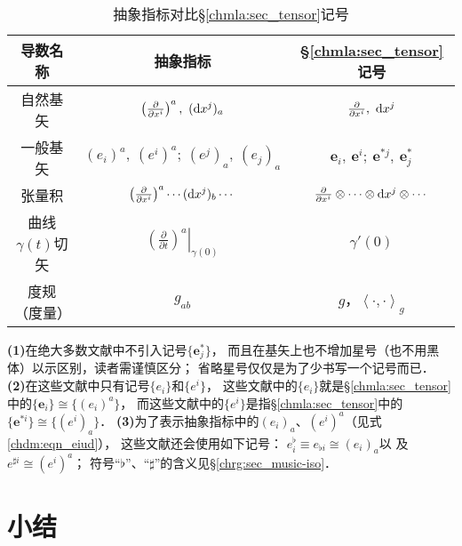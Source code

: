 \begin{table}[htb]
    \centering
    \caption{抽象指标对比\S\ref{chmla:sec_tensor}记号} \label{chmla:tab-aivscc}
    \begin{tabular}{|*3{c|}}
        \hline
        导数名称 & 抽象指标 & \S\ref{chmla:sec_tensor}记号 \\ 
        \hline
        自然基矢 & $\left(\frac{\partial}{\partial x^i} \right)^a,\  ({\rm d}x^j)_a$ 
                 & $\frac{\partial}{\partial x^i}, \  {\rm d}x^j$    \\ 
        \hline
        一般基矢 & $(e_i)^a,\ (e^i)^a;\ (e^j)_a,\ (e_j)_a$ &  $\boldsymbol{e}_i,\ \boldsymbol{e}^i;\ 
        \boldsymbol{e}^{*j},\  \boldsymbol{e}^{*}_{j} $    \\ 
        \hline
        张量积   & $\left(\frac{\partial}{\partial x^i} \right)^a \cdots ({\rm d}x^j)_b \cdots $ 
                   &  $\frac{\partial}{\partial x^i}\otimes \cdots\otimes
                   {\rm d}x^j \otimes \cdots$    \\ 
        \hline        
        曲线$\gamma(t)$切矢 & $\left.\left(\frac{\partial}{\partial t} \right)^a \right|_{\gamma(0)} $ 
          & $\gamma'(0)$  \\ 
        \hline
        度规（度量） & $g_{ab}$ & $g$，$\left<\cdot ,\cdot \right>_{g}$ \\ \hline
    \end{tabular}
\end{table}

\begin{remark}
	{\bfseries(1)}在绝大多数文献中不引入记号$\{\boldsymbol{e}_j^{*}\}$，
	而且在基矢上也不增加星号（也不用黑体）以示区别，读者需谨慎区分；
	省略星号仅仅是为了少书写一个记号而已．
	{\bfseries(2)}在这些文献中只有记号$\{{e}_i\}$和$\{{e}^{i}\}$，
	这些文献中的$\{{e}_i\}$就是\S\ref{chmla:sec_tensor}中的$\{\boldsymbol{e}_i\}\cong \{(e_i)^a\}$，
	而这些文献中的$\{{e}^{i}\}$是指\S\ref{chmla:sec_tensor}中的$\{\boldsymbol{e}^{*i}\}\cong \{(e^i)_a\}$．
	{\bfseries(3)}为了表示抽象指标中的$(e_i)_a$、$(e^i)^a$（见式\eqref{chdm:eqn_eiud}），
	这些文献还会使用如下记号：
	${e}_i^\flat \equiv {e}_{\flat i} \cong (e_i)_a$以
	及${e}^{\sharp i} \cong (e^i)^a$；
	符号“$\flat$”、“$\sharp$”的含义见\S\ref{chrg:sec_music-iso}．
\end{remark}



\section*{小结}


